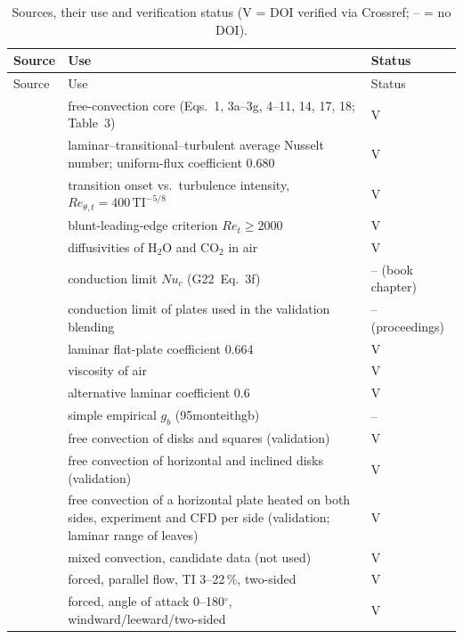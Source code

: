 \documentclass[11pt,a4paper]{article}
\newcommand{\Nu}{\mathit{Nu}}
\newcommand{\Rey}{\mathit{Re}}
\newcommand{\codeus}{\char95\allowbreak}
\DeclareRobustCommand{\code}[1]{\textnormal{\ttfamily\let\_\codeus #1}}
\newcommand{\Gtt}[1]{G22~Eq.~#1}
\begin{document}
{\small
\begin{longtable}{>{\raggedright\arraybackslash}p{3.4cm}>{\raggedright\arraybackslash}p{9.3cm}>{\raggedright\arraybackslash}p{1.8cm}}
\caption{Sources, their use and verification status (V = DOI verified via Crossref; – = no DOI).}\label{tab:register}\\
\toprule
Source & Use & Status\\
\midrule\endfirsthead
\toprule
Source & Use & Status\\
\midrule\endhead
\bottomrule\endfoot
\citet{graefe2022} & free-convection core (Eqs.~1, 3a--3g, 4--11, 14, 17, 18; Table~3) & V\\
\citet{lienhard2020} & laminar--transitional--turbulent average Nusselt number; uniform-flux coefficient 0.680 & V\\
\citet{mayle1991} & transition onset vs.\ turbulence intensity, $\Rey_{\theta,t} = 400\,\mathrm{TI}^{-5/8}$ & V\\
\citet{kottke1977} & blunt-leading-edge criterion $\Rey_t\ge2000$ & V\\
\citet{massman1998} & diffusivities of H$_2$O and CO$_2$ in air & V\\
\citet{yovanovich1998} & conduction limit $\Nu_c$ (\Gtt{3f}) & – (book chapter)\\
\citet{yovanovich1993} & conduction limit of plates used in the validation blending & – (proceedings)\\
\citet{pohlhausen1921} & laminar flat-plate coefficient 0.664 & V\\
\citet{sutherland1893} & viscosity of air & V\\
\citet{campbell1998} & alternative laminar coefficient 0.6 & V\\
\citet{monteith1973} & simple empirical $g_b$ (\code{monteith\_gb}) & –\\
\citet{hassani1989} & free convection of disks and squares (validation) & V\\
\citet{kobus2001,kobus2002} & free convection of horizontal and inclined disks (validation) & V\\
\citet{ryms2025} & free convection of a horizontal plate heated on both sides, experiment and CFD per side (validation; laminar range of leaves) & V\\
\citet{kobus1996} & mixed convection, candidate data (not used) & V\\
\citet{chen1988a} & forced, parallel flow, TI 3--22\,\%, two-sided & V\\
\citet{chen1988b} & forced, angle of attack 0--180$^\circ$, windward/leeward/two-sided & V\\

\end{longtable}}
\end{document}
